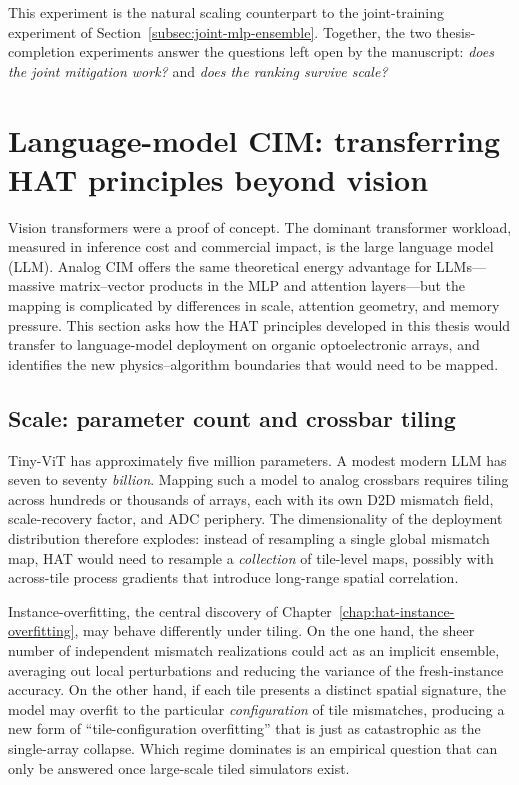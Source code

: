 This experiment is the natural scaling counterpart to the joint-training experiment of Section~\ref{subsec:joint-mlp-ensemble}.  Together, the two thesis-completion experiments answer the questions left open by the manuscript: \emph{does the joint mitigation work?} and \emph{does the ranking survive scale?}


\section{Language-model CIM: transferring HAT principles beyond vision}
\label{sec:language-model-cim}

Vision transformers were a proof of concept.  The dominant transformer workload, measured in inference cost and commercial impact, is the large language model (LLM).  Analog CIM offers the same theoretical energy advantage for LLMs---massive matrix--vector products in the MLP and attention layers---but the mapping is complicated by differences in scale, attention geometry, and memory pressure.  This section asks how the HAT principles developed in this thesis would transfer to language-model deployment on organic optoelectronic arrays, and identifies the new physics--algorithm boundaries that would need to be mapped.

\subsection{Scale: parameter count and crossbar tiling}
\label{subsec:lm-scale}

Tiny-ViT has approximately five million parameters.  A modest modern LLM has seven to seventy \emph{billion}.  Mapping such a model to analog crossbars requires tiling across hundreds or thousands of arrays, each with its own D2D mismatch field, scale-recovery factor, and ADC periphery.  The dimensionality of the deployment distribution therefore explodes: instead of resampling a single global mismatch map, HAT would need to resample a \emph{collection} of tile-level maps, possibly with across-tile process gradients that introduce long-range spatial correlation.

Instance-overfitting, the central discovery of Chapter~\ref{chap:hat-instance-overfitting}, may behave differently under tiling.  On the one hand, the sheer number of independent mismatch realizations could act as an implicit ensemble, averaging out local perturbations and reducing the variance of the fresh-instance accuracy.  On the other hand, if each tile presents a distinct spatial signature, the model may overfit to the particular \emph{configuration} of tile mismatches, producing a new form of ``tile-configuration overfitting'' that is just as catastrophic as the single-array collapse.  Which regime dominates is an empirical question that can only be answered once large-scale tiled simulators exist.

